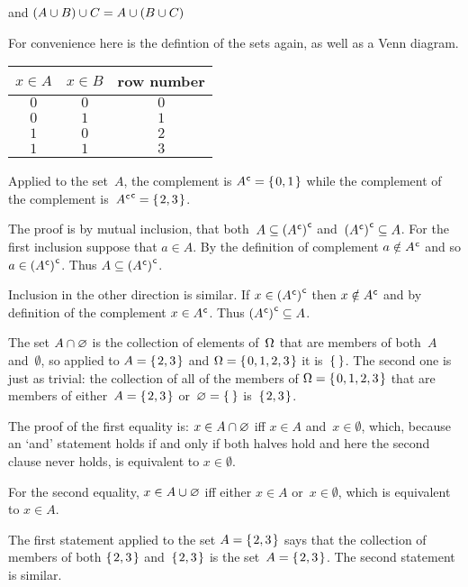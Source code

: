 \documentclass{ibl}  %
\begin{document}
\begin{problem}
\begin{items}
  and
  $(A\cup B)\cup C=A\cup (B\cup C)$ 
\end{items}
\begin{answer}
For convenience here is the defintion of the sets again, as well
as a Venn diagram.
\begin{center} \small
  \begin{tabular}{cc|c}
    $x\in A$  &$x\in B$  &row number \\ \hline
    $0$       &$0$       &$0$  \\
    $0$       &$1$       &$1$  \\
    $1$       &$0$       &$2$  \\
    $1$       &$1$       &$3$  
  \end{tabular}
    \hspace*{3em}
\end{center}
\begin{items}
\item  Applied to the set~$A$, the complement is 
  ${A}^{\mspace{1mu}\mathsf{c}}=\mbox{$\{\hspace{0.1em}0,1\hspace{0.1em}\}$}$ while
  the complement of the complement is~${{A}^{\mspace{1mu}\mathsf{c}}}^{\mspace{1mu}\mathsf{c}}=\mbox{$\{\hspace{0.1em}2,3\hspace{0.1em}\}$}$.
  
  The proof 
  is by mutual inclusion, that both~$A\subseteq{({A}^{\mspace{1mu}\mathsf{c}})}^{\mspace{1mu}\mathsf{c}}$
  and~${({A}^{\mspace{1mu}\mathsf{c}})}^{\mspace{1mu}\mathsf{c}}\subseteq A$.
  For the first inclusion suppose that $a\in A$.
  By the definition of complement $a\notin{A}^{\mspace{1mu}\mathsf{c}}$ and
  so $a\in{({A}^{\mspace{1mu}\mathsf{c}})}^{\mspace{1mu}\mathsf{c}}$.
  Thus $A\subseteq{({A}^{\mspace{1mu}\mathsf{c}})}^{\mspace{1mu}\mathsf{c}}$.

  Inclusion in the other direction is similar.
  If $x\in{({A}^{\mspace{1mu}\mathsf{c}})}^{\mspace{1mu}\mathsf{c}}$
  then $x\notin{A}^{\mspace{1mu}\mathsf{c}}$ and
  by definition of the complement $x\in{A}^{\mspace{1mu}\mathsf{c}}$.
  Thus ${({A}^{\mspace{1mu}\mathsf{c}})}^{\mspace{1mu}\mathsf{c}}\subseteq A$. 
\item The set $A\cap\varnothing$ 
  is the collection of
  elements of~$\Omega$ that are members of both~$A$ and~$\emptyset$,
  so applied to $A=\mbox{$\{\hspace{0.1em}2,3\hspace{0.1em}\}$}$ and $\Omega=\mbox{$\{\hspace{0.1em}0,1,2,3\hspace{0.1em}\}$}$ it 
  is~$\set{}$.
  The second one is just as trivial: the collection of all of the members of 
  $\Omega=\mbox{$\{\hspace{0.1em}0,1,2,3\hspace{0.1em}\}$}$ that are members of either~$A=\mbox{$\{\hspace{0.1em}2,3\hspace{0.1em}\}$}$
  or~$\emptyset=\set{}$ is~$\mbox{$\{\hspace{0.1em}2,3\hspace{0.1em}\}$}$.

  The proof of the first equality is: $x\in A\cap\varnothing$
  iff $x\in A$ and~$x\in\emptyset$, 
  which, because an `and' statement holds if and only if both halves hold
  and here the second clause never holds,
  is equivalent to $x\in\emptyset$. 

  For the second equality, 
  $x\in A\cup\varnothing$ iff either $x\in A$ or~$x\in\emptyset$,
  which is equivalent to $x\in A$.
\item The first statement applied to the set $A=\mbox{$\{\hspace{0.1em}2,3\hspace{0.1em}\}$}$
  says that the collection of members of both
  $\mbox{$\{\hspace{0.1em}2,3\hspace{0.1em}\}$}$ and~$\mbox{$\{\hspace{0.1em}2,3\hspace{0.1em}\}$}$ is the set~$A=\mbox{$\{\hspace{0.1em}2,3\hspace{0.1em}\}$}$.
  The second statement is similar.


\end{items}
\end{answer}
\end{problem}
\end{document}
